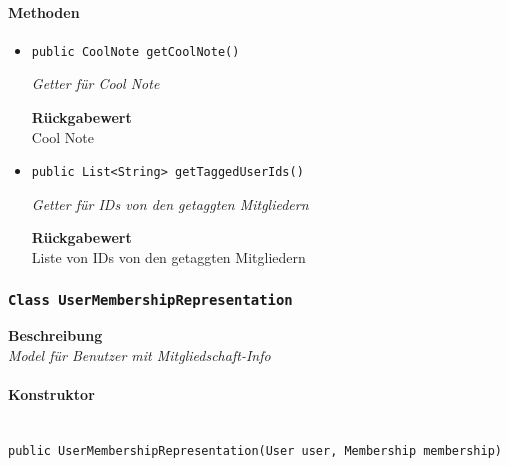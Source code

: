     \paragraph*{Methoden}
    \begin{itemize}
    	\item{\texttt{public CoolNote getCoolNote()}}
    	
    	\textit{Getter für Cool Note}
    	
    	
    	
    	\textbf{Rückgabewert} \\
    	Cool Note        \item{\texttt{public List<String> getTaggedUserIds()}}
    	
    	\textit{Getter für IDs von den getaggten Mitgliedern}
    	
    	
    	
    	\textbf{Rückgabewert} \\
    	Liste von IDs von den getaggten Mitgliedern
    \end{itemize}
    \subsubsection{\texttt{Class UserMembershipRepresentation}}
    \textbf{Beschreibung} \\
    \textit{Model für Benutzer mit Mitgliedschaft-Info}
    \paragraph*{Konstruktor}\mbox{} \\
    \texttt{public UserMembershipRepresentation(User user, Membership membership)} \\
